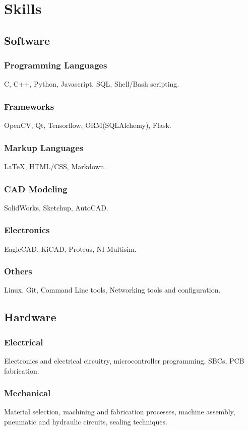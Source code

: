 \documentclass[a4paper]{article}
\begin{document}
	\section{Skills}
		\subsection{Software}
			\subsubsection{Programming Languages}
			C, C++, Python, Javascript, SQL, Shell/Bash scripting.
			\subsubsection{Frameworks}
			OpenCV, Qt, Tensorflow, ORM(SQLAlchemy), Flask.
			\subsubsection{Markup Languages}
			{\LaTeX}, HTML/CSS, Markdown.
			\subsubsection{CAD Modeling}	
			SolidWorks, Sketchup, AutoCAD.
			\subsubsection{Electronics}	
			EagleCAD, KiCAD, Proteus, NI Multisim.
			\subsubsection{Others}
			Linux, Git, Command Line tools, Networking tools and configuration.
		\subsection{Hardware}
			\subsubsection{Electrical}
			Electronics and electrical circuitry, microcontroller programming, SBCs, PCB fabrication.
			\subsubsection{Mechanical}
			Material selection, machining and fabrication processes, machine assembly, pneumatic and hydraulic circuits, sealing techniques.
\end{document}
